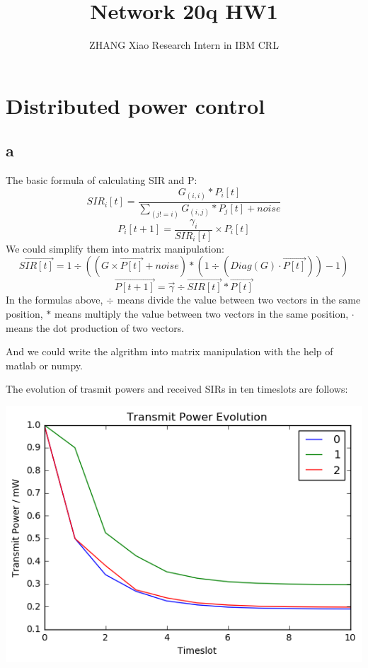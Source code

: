 \documentclass[12pt,a4paper]{article}
\author{ZHANG Xiao Research Intern in IBM CRL}
\title{Network 20q HW1}
\begin{document}
\maketitle
\pagebreak

\section{Distributed power control}

\subsection{a}
The basic formula of calculating SIR and P:
\begin{equation}
SIR_i[t] = \frac{G_{(i,i)}*P_i[t]}{\sum_{(j != i)} G_{(i,j)}*P_{j}[t] + noise}
\end{equation}
\begin{equation}
P_i[t+1] = \frac{\gamma_i}{SIR_i[t]} \times P_i[t]
\end{equation}
We could simplify them into matrix manipulation:
\begin{equation}
\vec{SIR[t]} = 1 \div ( (G \times \vec{P[t]} + noise) *  (1 \div (Diag(G) \cdot \vec{P[t]} )  )- 1 )
\end{equation}
\begin{equation}
\vec{P[t+1]} = \vec{\gamma} \div \vec{SIR[t]} * \vec{P[t]}
\end{equation}
In the formulas above, $\div$ means divide the value between two vectors in the same position, $*$ means multiply the value between two vectors in the same position, $\cdot$ means the dot production of two vectors.

And we could write the algrithm into matrix manipulation with the help of matlab or numpy.

The evolution of trasmit powers and received SIRs in ten timeslots are follows:

\includegraphics[width=\textwidth]{PIC/a-1.png}
\end{document}
